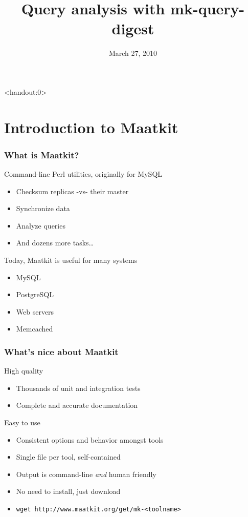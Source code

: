 \documentclass{beamer}
\title{Query analysis with mk-query-digest}
\date{March 27, 2010}
\begin{document}
\begin{frame}<handout:0>
  \titlepage
\end{frame}

\section{Introduction to Maatkit}

\begin{frame}
   \frametitle{What is Maatkit?}
   \begin{block}{Command-line Perl utilities, originally for MySQL}
      \begin{itemize}
         \item Checksum replicas -vs- their master
         \item Synchronize data
         \item Analyze queries
         \item And dozens more tasks\dots
      \end{itemize}
   \end{block}
   \pause
   \begin{block}{Today, Maatkit is useful for many systems}
      \begin{itemize}
         \item MySQL
         \item PostgreSQL
         \item Web servers
         \item Memcached
      \end{itemize}
   \end{block}
\end{frame}

\begin{frame}
   \frametitle{What's nice about Maatkit}
   \begin{block}{High quality}
      \begin{itemize}
         \item Thousands of unit and integration tests
         \item Complete and accurate documentation
      \end{itemize}
   \end{block}
   \pause
   \begin{block}{Easy to use}
      \begin{itemize}
         \item Consistent options and behavior amongst tools
         \item Single file per tool, self-contained
         \item Output is command-line \emph{and} human friendly
         \item No need to install, just download
         \item \texttt{wget http://www.maatkit.org/get/mk-<toolname>}
      \end{itemize}
   \end{block}
\end{frame}
\end{document}
